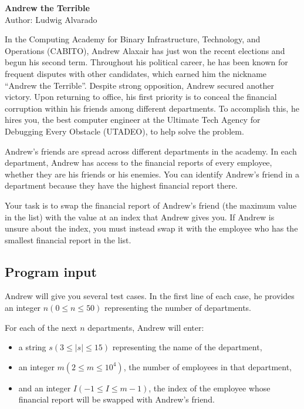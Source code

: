 \documentclass[11pt,a4paper]{article}
\begin{document}
\begin{center}
  {\LARGE \bf Andrew the Terrible}\\[1ex]
  Author: Ludwig Alvarado
\end{center}

In the Computing Academy for Binary Infrastructure, Technology, and Operations (CABITO), Andrew Alaxair has just won the recent elections and begun his second term. Throughout his political career, he has been known for frequent disputes with other candidates, which earned him the nickname ``Andrew the Terrible''. Despite strong opposition, Andrew secured another victory. Upon returning to office, his first priority is to conceal the financial corruption within his friends among different departments. To accomplish this, he hires you, the best computer engineer at the Ultimate Tech Agency for Debugging Every Obstacle (UTADEO), to help solve the problem. 

Andrew’s friends are spread across different departments in the academy. In each department, Andrew has access to the financial reports of every employee, whether they are his friends or his enemies. You can identify Andrew’s friend in a department because they have the highest financial report there.

Your task is to swap the financial report of Andrew’s friend (the maximum value in the list) with the value at an index that Andrew gives you. If Andrew is unsure about the index, you must instead swap it with the employee who has the smallest financial report in the list.


\subsection*{Program input}

Andrew will give you several test cases. In the first line of each case, he provides an integer \(n (0 \leq n \leq 50)\) representing the number of departments.

For each of the next \(n\) departments, Andrew will enter:

\begin{itemize}
  \item a string \(s (3 \leq |s| \leq 15)\) representing the name of the department,
  \item an integer \(m (2 \leq m \leq 10^4)\), the number of employees in that department,
  \item and an integer \(I (-1 \leq I \leq m-1)\), the index of the employee whose financial report will be swapped with Andrew’s friend.  
\end{itemize}
\end{document}
